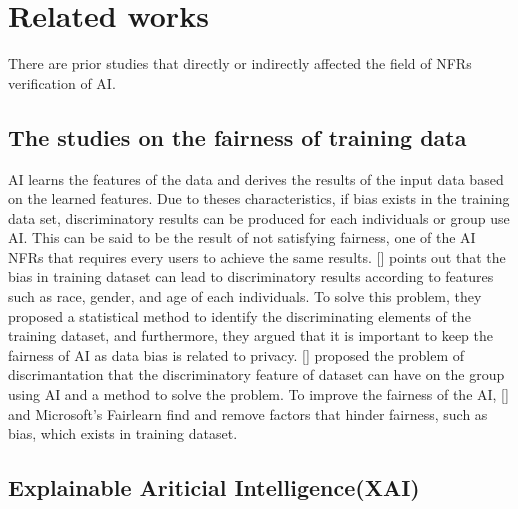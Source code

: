 \documentclass[journal,article,submit,moreauthors,pdftex]{Definitions/mdpi}
\begin{document}
\section{Related works}

There are prior studies that directly or indirectly affected the field of NFRs verification of AI.


\subsection{The studies on the fairness of training data}

AI learns the features of the data and derives the results of the input data based on the learned features. Due to theses characteristics, if bias exists in the training data set, discriminatory results can be produced for each individuals or group use AI.
This can be said to be the result of not satisfying fairness, one of the AI NFRs that requires every users to achieve the same results.
[] points out that the bias in training dataset can lead to discriminatory results according to features such as race, gender, and age of each individuals.
To solve this problem, they proposed a statistical method to identify the discriminating elements of the training dataset, and furthermore, they argued that it is important to keep the fairness of AI as data bias is related to privacy.
[] proposed the problem of discrimantation that the discriminatory feature of dataset can have on the group using AI and a method to solve the problem.
To improve the fairness of the AI, [] and Microsoft's Fairlearn find and remove factors that hinder fairness, such as bias, which exists in training dataset.

\subsection{Explainable Ariticial Intelligence(XAI)}
\end{document}
